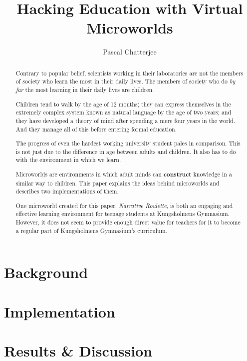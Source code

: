 \documentclass[a4paper]{report}
\title{Hacking Education with Virtual Microworlds}
\author{Pascal Chatterjee}
\date{\parbox{\linewidth}{\centering%
  \today\endgraf\bigskip
  KTH Department of Computer Science (CSC) \endgraf
  Thesis supervisor: Linda Kann}}
\begin{document}
\maketitle

\begin{abstract}
Contrary to popular belief, scientists working in their laboratories are not the members of society who learn the most in their daily lives. The members of society who do \textit{by far} the most learning in their daily lives are children. 

Children tend to walk by the age of 12 months; they can express themselves in the extremely complex system known as natural language by the age of two years; and they have developed a theory of mind after spending a mere four years in the world. And they manage all of this before entering formal education.

The progress of even the hardest working university student pales in comparison. This is not just due to the difference in age between adults and children. It also has to do with the environment in which we learn.

Microworlds are environments in which adult minds can \textbf{construct} knowledge in a similar way to children. This paper explains the ideas behind microworlds and describes two implementations of them. 

One microworld created for this paper, \textit{Narrative Roulette}, is both an engaging and effective learning environment for teenage students at Kungsholmens Gymnasium. However, it does not seem to provide enough direct value for teachers for it to become a regular part of Kungsholmens Gymnasium's curriculum.
\end{abstract}

\tableofcontents



\chapter{Background}









\chapter{Implementation}




\chapter{Results \& Discussion}







\end{document}
